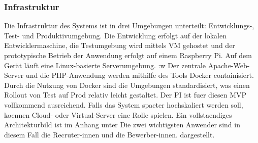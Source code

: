 \subsubsection{Infrastruktur}
Die Infrastruktur des Systems ist in drei Umgebungen unterteilt: Entwicklungs-, Test- und Produktivumgebung. 
Die Entwicklung erfolgt auf der lokalen Entwicklermaschine, die Testumgebung wird mittels VM gehostet und der prototypische Betrieb der Anwendung erfolgt auf einem Raspberry Pi. 
Auf dem Gerät läuft eine Linux-basierte Serverumgebung. :w
Der zentrale Apache-Web-Server und die PHP-Anwendung werden mithilfe des Tools Docker containisiert.
Durch die Nutzung von Docker sind die Umgebungen standardisiert, was einen Rollout von Test auf Prod relativ leicht gestaltet.
Der PI ist fuer diesen MVP vollkommend ausreichend. Falls das System spaeter hochskaliert werden soll, koennen Cloud- oder Virtual-Server eine Rolle spielen.
Ein vollstaendiges Architekturbild ist im Anhang unter 
Die zwei wichtigsten Anwender sind in diesem Fall die Recruter-innen und die Bewerber-innen.
dargestellt. 
